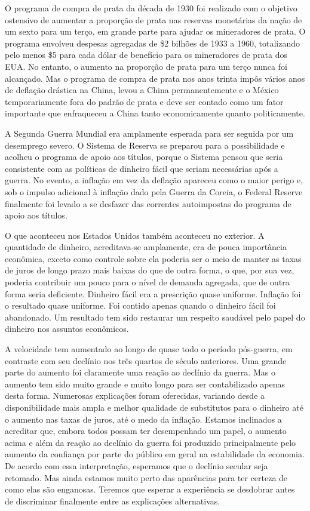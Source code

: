 \documentclass[a4paper,12pt]{article}[abntex2]
\begin{document}
O programa de compra de prata da década de 1930 foi realizado com o objetivo ostensivo de aumentar a proporção de prata nas reservas monetárias da nação de um sexto para um terço, em grande parte para ajudar os mineradores de prata. O programa envolveu despesas agregadas de \$2 bilhões de 1933 a 1960, totalizando pelo menos \$5 para cada dólar de benefício para os mineradores de prata dos EUA. No entanto, o aumento na proporção de prata para um terço nunca foi alcançado. Mas o programa de compra de prata nos anos trinta impôs vários anos de deflação drástica na China, levou a China permanentemente e o México temporariamente fora do padrão de prata e deve ser contado como um fator importante que enfraqueceu a China tanto economicamente quanto politicamente.

A Segunda Guerra Mundial era amplamente esperada para ser seguida por um desemprego severo. O Sistema de Reserva se preparou para a possibilidade e acolheu o programa de apoio aos títulos, porque o Sistema pensou que seria consistente com as políticas de dinheiro fácil que seriam necessárias após a guerra. No evento, a inflação em vez da deflação apareceu como o maior perigo e, sob o impulso adicional à inflação dado pela Guerra da Coreia, o Federal Reserve finalmente foi levado a se desfazer das correntes autoimpostas do programa de apoio aos títulos.

O que aconteceu nos Estados Unidos também aconteceu no exterior. A quantidade de dinheiro, acreditava-se amplamente, era de pouca importância econômica, exceto como controle sobre ela poderia ser o meio de manter as taxas de juros de longo prazo mais baixas do que de outra forma, o que, por sua vez, poderia contribuir um pouco para o nível de demanda agregada, que de outra forma seria deficiente. Dinheiro fácil era a prescrição quase uniforme. Inflação foi o resultado quase uniforme. Foi contido apenas quando o dinheiro fácil foi abandonado. Um resultado tem sido restaurar um respeito saudável pelo papel do dinheiro nos assuntos econômicos.

A velocidade tem aumentado ao longo de quase todo o período pós-guerra, em contraste com seu declínio nos três quartos de século anteriores. Uma grande parte do aumento foi claramente uma reação ao declínio da guerra. Mas o aumento tem sido muito grande e muito longo para ser contabilizado apenas desta forma. Numerosas explicações foram oferecidas, variando desde a disponibilidade mais ampla e melhor qualidade de substitutos para o dinheiro até o aumento nas taxas de juros, até o medo da inflação. Estamos inclinados a acreditar que, embora todos possam ter desempenhado um papel, o aumento acima e além da reação ao declínio da guerra foi produzido principalmente pelo aumento da confiança por parte do público em geral na estabilidade da economia. De acordo com essa interpretação, esperamos que o declínio secular seja retomado. Mas ainda estamos muito perto das aparências para ter certeza de como elas são enganosas. Teremos que esperar a experiência se desdobrar antes de discriminar finalmente entre as explicações alternativas.
\end{document}
